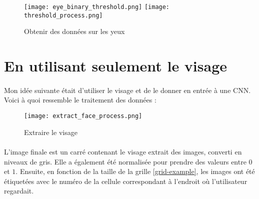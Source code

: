 \begin{figure}[H]
    \centering
    \texttt{[image: eye\_binary\_threshold.png]}
    \texttt{[image: threshold\_process.png]}
    \caption{Obtenir des données sur les yeux}
\end{figure}

\clearpage

\section{En utilisant seulement le visage}
\paragraph{}
Mon idée suivante était d'utiliser le visage et de le donner en entrée à une CNN.
Voici à quoi ressemble le traitement des données :
\begin{figure}[H]
    \centering
    \texttt{[image: extract\_face\_process.png]}
    \caption{Extraire le visage}
    \label{fig_extracted_faces}
\end{figure}

\paragraph{}

L'image finale est un carré contenant le visage extrait des images, converti en niveaux de gris.
Elle a également été normalisée pour prendre des valeurs entre $0$ et $1$.
Ensuite, en fonction de la taille de la grille \ref{grid-example}, les images ont été étiquetées avec le numéro de la cellule correspondant à l'endroit où l'utilisateur regardait.

